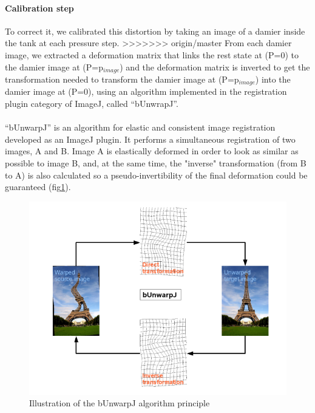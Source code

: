 \paragraph{Calibration step} 
To correct it, we calibrated this distortion by taking an image of a damier inside the tank at each pressure step. 
>>>>>>> origin/master
 From each damier image, we extracted a deformation matrix that links the rest state at (P=0) to the damier image at (P=p$_{image}$) and the deformation matrix is inverted to get the transformation needed to transform the damier image at (P=p$_{image}$) into the damier image at (P=0), using an algorithm implemented in the registration plugin category of ImageJ, called "`bUnwrapJ"'.
\paragraph{}
"`bUnwarpJ"' is an algorithm for elastic and consistent image registration developed as an ImageJ plugin. It performs a simultaneous registration of two images, A and B. Image A is elastically deformed in order to look as similar as possible to image B, and, at the same time, the "inverse" transformation (from B to A) is also calculated so a pseudo-invertibility of the final deformation could be guaranteed (fig\ref{fig:scheme_bunwrapJ}).

\begin{figure}[H] %
	\centering%
  \includegraphics[width=\textwidth]{figures/Chapter_1/BUnwarpJ_scheme.png}
	\caption{Illustration of the bUnwarpJ algorithm principle}
	\label{fig:scheme_bunwrapJ}
\end{figure}


